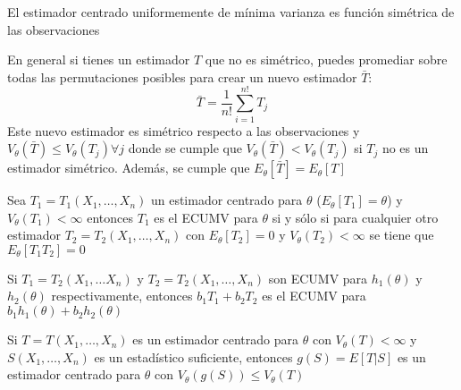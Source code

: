 \begin{teorema}
  El estimador centrado uniformemente de mínima varianza es función simétrica de las observaciones
\end{teorema}


\begin{observación}
En general si tienes un estimador $T$ que no es simétrico, puedes promediar sobre todas las permutaciones posibles para crear un nuevo estimador $\bar{T}$:
$$\bar{T} = \frac{1}{n!}\sum_{i = 1}^{n!} T_j$$
Este nuevo estimador es simétrico respecto a las observaciones y $V_{\theta}(\bar{T}) \leq V_{\theta}(T_j) \forall j$ donde se cumple que $V_{\theta}(\bar{T}) < V_{\theta}(T_j)$ si $T_j$ no es un estimador simétrico. Además, se cumple que $E_{\theta}[\bar{T}] = E_{\theta}[T]$
\end{observación}

\begin{teorema}
  Sea $T_1 = T_1(X_1, \ldots, X_n)$ un estimador centrado para $\theta$ ($E_{\theta}[T_1] = \theta$) y $V_{\theta}(T_1) < \infty$ entonces $T_1$ es el ECUMV para $\theta$ si y sólo si para cualquier otro estimador $T_2 = T_2(X_1, \ldots, X_n)$ con $E_{\theta}[T_2] = 0$ y $V_{\theta}(T_2) < \infty$ se tiene que $E_{\theta}[T_1T_2] = 0$
\end{teorema}

\begin{corolario}
  Si $T_1 = T_2(X_1, \ldots X_n)$ y $T_2 = T_2(X_1, \ldots, X_n)$ son ECUMV para $h_1(\theta)$ y $h_2(\theta)$ respectivamente, entonces $b_1T_1 + b_2T_2$ es el ECUMV para $b_1h_1(\theta) + b_2h_2(\theta)$
\end{corolario}

\begin{teorema}
  Si $T = T(X_1, \ldots, X_n)$ es un estimador centrado para $\theta$ con $V_{\theta}(T) < \infty$ y $S(X_1, \ldots, X_n)$ es un estadístico suficiente, entonces $g(S) = E[T | S]$ es un estimador centrado para $\theta$ con $V_{\theta}(g(S)) \leq V_{\theta}(T)$
\end{teorema}

